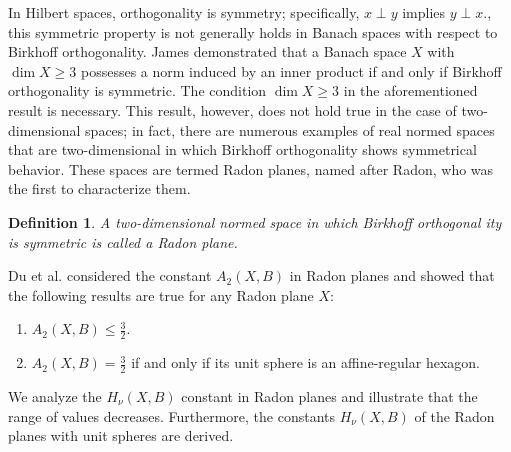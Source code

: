 \documentclass[preprint,12pt]{elsarticle}
\newtheorem{definition}[thm]{Definition}
\numberwithin{equation}{section}
\begin{document}
In Hilbert spaces, orthogonality is symmetry; specifically, $x \perp y$ implies $y \perp x$., this symmetric property is not generally holds in Banach spaces with respect to Birkhoff orthogonality.  
James \cite{james1947inner} demonstrated that a Banach space $X$ with $\dim X \geq 3$ possesses a norm induced by an inner product if and only if Birkhoff orthogonality is symmetric. The condition $\dim X \geq 3$ in the aforementioned result is necessary. This result, however, does not hold true in the case of two-dimensional spaces; in fact, there are numerous examples of real normed spaces that are two-dimensional in which Birkhoff orthogonality shows symmetrical behavior. These spaces are termed Radon planes, named after Radon, who was the first to characterize them. 
\begin{definition}
A two-dimensional normed space in which Birkhoff orthogonal
ity is symmetric is called a Radon plane.
\end{definition}
Du et al. \cite{du2025some} considered the constant $A_2(X,B)$ in Radon
planes and showed that the following results are true for any Radon plane $X$:
\begin{enumerate}
    \item $A_2(X,B)\leq \frac{3}{2}$.
    \item $A_2(X,B)=\frac{3}{2}$
 if and only if its unit sphere 
 is an affine-regular hexagon.
\end{enumerate}
 We analyze the $H_\nu(X,B)$ constant in Radon planes and illustrate that the range of values decreases. Furthermore, the constants $H_\nu(X,B)$ of the Radon planes with unit spheres are derived.
\end{document}
